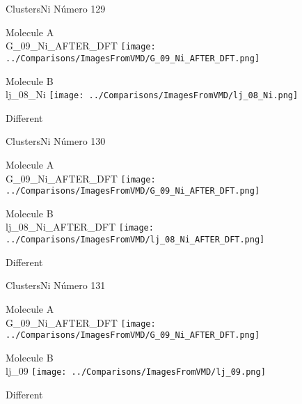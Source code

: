 \vtab[-3cm]
\begin{center}
{\large ClustersNi \tab Número 129}
\end{center}
\begin{multicols}{2}
\begin{center}
Molecule A \\ 
G\_09\_Ni\_AFTER\_DFT
\texttt{[image: ../Comparisons/ImagesFromVMD/G\_09\_Ni\_AFTER\_DFT.png]}
\\
\vtab

\columnbreak
Molecule B \\ 
lj\_08\_Ni
\texttt{[image: ../Comparisons/ImagesFromVMD/lj\_08\_Ni.png]}
\\
\vtab


\end{center}
\end{multicols}
\begin{center}
\textcolor{NavyBlue}{\Large Different}
\end{center}

 \newpage

\vtab[-3cm]
\begin{center}
{\large ClustersNi \tab Número 130}
\end{center}
\begin{multicols}{2}
\begin{center}
Molecule A \\ 
G\_09\_Ni\_AFTER\_DFT
\texttt{[image: ../Comparisons/ImagesFromVMD/G\_09\_Ni\_AFTER\_DFT.png]}
\\
\vtab

\columnbreak
Molecule B \\ 
lj\_08\_Ni\_AFTER\_DFT
\texttt{[image: ../Comparisons/ImagesFromVMD/lj\_08\_Ni\_AFTER\_DFT.png]}
\\
\vtab


\end{center}
\end{multicols}
\begin{center}
\textcolor{NavyBlue}{\Large Different}
\end{center}

 \newpage

\vtab[-3cm]
\begin{center}
{\large ClustersNi \tab Número 131}
\end{center}
\begin{multicols}{2}
\begin{center}
Molecule A \\ 
G\_09\_Ni\_AFTER\_DFT
\texttt{[image: ../Comparisons/ImagesFromVMD/G\_09\_Ni\_AFTER\_DFT.png]}
\\
\vtab

\columnbreak
Molecule B \\ 
lj\_09
\texttt{[image: ../Comparisons/ImagesFromVMD/lj\_09.png]}
\\
\vtab


\end{center}
\end{multicols}
\begin{center}
\textcolor{NavyBlue}{\Large Different}
\end{center}


